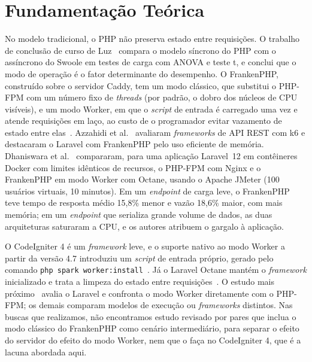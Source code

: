 \documentclass[sigconf, nonacm, screen, anonymous, language=portuguese, language=spanish, language={main=english}]{acmart}
\begin{document}
\section{Fundamentação Teórica}
No modelo tradicional, o PHP não preserva estado entre requisições. O trabalho de conclusão de curso de Luz~\cite{luz2024} compara o modelo síncrono do PHP com o assíncrono do Swoole em testes de carga com ANOVA e teste t, e conclui que o modo de operação é o fator determinante do desempenho. O FrankenPHP, construído sobre o servidor Caddy, tem um modo clássico, que substitui o PHP-FPM com um número fixo de \textit{threads} (por padrão, o dobro dos núcleos de CPU visíveis), e um modo Worker, em que o \textit{script} de entrada é carregado uma vez e atende requisições em laço, ao custo de o programador evitar vazamento de estado entre elas~\cite{dungalas2024}. Azzahidi et al.~\cite{azzahidi2025} avaliaram \textit{frameworks} de API REST com k6 e destacaram o Laravel com FrankenPHP pelo uso eficiente de memória. Dhaniswara et al.~\cite{dhaniswara2025} compararam, para uma aplicação Laravel~12 em contêineres Docker com limites idênticos de recursos, o PHP-FPM com Nginx e o FrankenPHP em modo Worker com Octane, usando o Apache JMeter (100 usuários virtuais, 10 minutos). Em um \textit{endpoint} de carga leve, o FrankenPHP teve tempo de resposta médio 15,8\% menor e vazão 18,6\% maior, com mais memória; em um \textit{endpoint} que serializa grande volume de dados, as duas arquiteturas saturaram a CPU, e os autores atribuem o gargalo à aplicação.

O CodeIgniter 4 é um \textit{framework} leve, e o suporte nativo ao modo Worker a partir da versão 4.7 introduziu um \textit{script} de entrada próprio, gerado pelo comando \texttt{php spark worker:install}~\cite{codeigniter2024}. Já o Laravel Octane mantém o \textit{framework} inicializado e trata a limpeza do estado entre requisições~\cite{otwell2024}. O estudo mais próximo~\cite{dhaniswara2025} avalia o Laravel e confronta o modo Worker diretamente com o PHP-FPM; os demais comparam modelos de execução ou \textit{frameworks} distintos. Nas buscas que realizamos, não encontramos estudo revisado por pares que inclua o modo clássico do FrankenPHP como cenário intermediário, para separar o efeito do servidor do efeito do modo Worker, nem que o faça no CodeIgniter 4, que é a lacuna abordada aqui.
\end{document}
